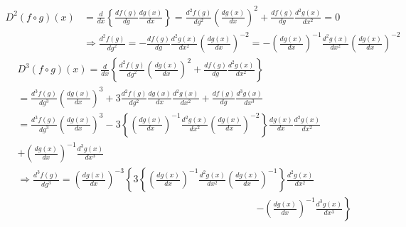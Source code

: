 \documentclass[aps,preprint]{revtex4}%
\begin{document}
\begin{align}
D^{2}\left(  f\circ g\right)  \left(  x\right)   &  =\frac{d}{dx}\left\{
\frac{df\left(  g\right)  }{dg}\frac{dg\left(  x\right)  }{dx}\right\}
=\frac{d^{2}f\left(  g\right)  }{dg^{2}}\left(  \frac{dg\left(  x\right)
}{dx}\right)  ^{2}+\frac{df\left(  g\right)  }{dg}\frac{d^{2}g\left(
x\right)  }{dx^{2}}=0\nonumber\\
&  \Rightarrow\frac{d^{2}f\left(  g\right)  }{dg^{2}}=-\frac{df\left(
g\right)  }{dg}\frac{d^{2}g\left(  x\right)  }{dx^{2}}\left(  \frac{dg\left(
x\right)  }{dx}\right)  ^{-2}=-\left(  \frac{dg\left(  x\right)  }{dx}\right)
^{-1}\frac{d^{2}g\left(  x\right)  }{dx^{2}}\left(  \frac{dg\left(  x\right)
}{dx}\right)  ^{-2}%
\end{align}%
\begin{align}
&  D^{3}\left(  f\circ g\right)  \left(  x\right)  =\frac{d}{dx}\left\{
\frac{d^{2}f\left(  g\right)  }{dg^{2}}\left(  \frac{dg\left(  x\right)  }%
{dx}\right)  ^{2}+\frac{df\left(  g\right)  }{dg}\frac{d^{2}g\left(  x\right)
}{dx^{2}}\right\} \nonumber\\
&  =\frac{d^{3}f\left(  g\right)  }{dg^{3}}\left(  \frac{dg\left(  x\right)
}{dx}\right)  ^{3}+3\frac{d^{2}f\left(  g\right)  }{dg^{2}}\frac{dg\left(
x\right)  }{dx}\frac{d^{2}g\left(  x\right)  }{dx^{2}}+\frac{df\left(
g\right)  }{dg}\frac{d^{3}g\left(  x\right)  }{dx^{3}}\nonumber\\
&  =\frac{d^{3}f\left(  g\right)  }{dg^{3}}\left(  \frac{dg\left(  x\right)
}{dx}\right)  ^{3}-3\left\{  \left(  \frac{dg\left(  x\right)  }{dx}\right)
^{-1}\frac{d^{2}g\left(  x\right)  }{dx^{2}}\left(  \frac{dg\left(  x\right)
}{dx}\right)  ^{-2}\right\}  \frac{dg\left(  x\right)  }{dx}\frac
{d^{2}g\left(  x\right)  }{dx^{2}}\nonumber\\
&  +\left(  \frac{dg\left(  x\right)  }{dx}\right)  ^{-1}\frac{d^{3}g\left(
x\right)  }{dx^{3}}\nonumber\\
&  \Rightarrow\frac{d^{3}f\left(  g\right)  }{dg^{3}}=\left(  \frac{dg\left(
x\right)  }{dx}\right)  ^{-3}\left\{  3\left\{  \left(  \frac{dg\left(
x\right)  }{dx}\right)  ^{-1}\frac{d^{2}g\left(  x\right)  }{dx^{2}}\left(
\frac{dg\left(  x\right)  }{dx}\right)  ^{-1}\right\}  \frac{d^{2}g\left(
x\right)  }{dx^{2}}\right. \nonumber\\
&  \qquad\qquad\qquad\qquad\qquad\qquad\qquad\qquad\qquad\qquad\qquad
\qquad\left.  -\left(  \frac{dg\left(  x\right)  }{dx}\right)  ^{-1}%
\frac{d^{3}g\left(  x\right)  }{dx^{3}}\right\}
\end{align}
\end{document}
